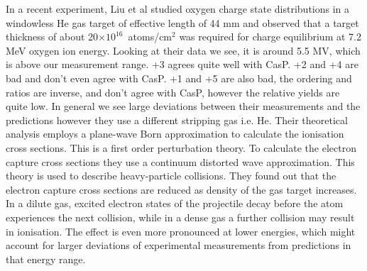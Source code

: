 \documentclass[a4paper,fleqn,review]{cas-sc}
\begin{document}
In a recent experiment, Liu et al \cite{Liu2014} studied oxygen charge state distributions in a windowless He gas target of effective length of 44 mm and observed that a target thickness of about 20$\times10^{16}$~atoms/cm$^2$  was required for charge equilibrium at 7.2 MeV oxygen ion energy. Looking at their data we see, it is around 5.5 MV, which is above our measurement range. +3 agrees quite well with CasP. +2 and +4 are bad and don’t even agree with CasP. +1 and +5 are also bad, the ordering and ratios are inverse, and don’t agree with CasP, however the relative yields are quite low. In general we see large deviations between their measurements and the predictions however they use a different stripping gas i.e. He. Their theoretical analysis employs a plane-wave Born approximation to calculate the ionisation cross sections. This is a first order perturbation theory.  To calculate the electron capture cross sections they use a continuum distorted wave approximation. This theory is used to describe heavy-particle collisions. They found out that the electron capture cross sections are reduced as density of the gas target increases. In a dilute gas, excited electron states of the projectile decay before the atom experiences the next collision, while in a dense gas a further collision may result in ionisation. The effect is even more pronounced at lower energies, which might account for larger deviations of experimental measurements from predictions in that energy range.  
 
\end{document}
